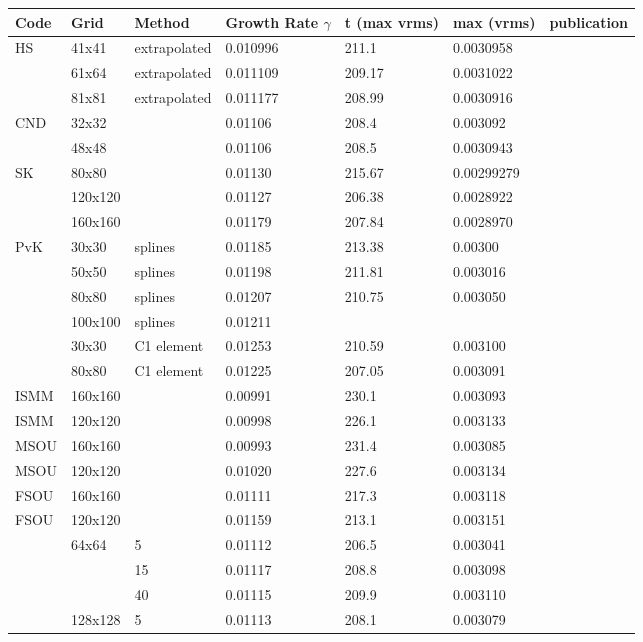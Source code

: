 \newpage



\begin{center}
\begin{tabular}{lllllll}
\hline
Code & Grid & Method & Growth Rate $\gamma$ & t (max vrms) & max (vrms)   & publication\\
\hline\hline
HS & 41x41 & extrapolated & 0.010996 & 211.1  & 0.0030958 & \cite{vaks97}\\
   & 61x64 & extrapolated & 0.011109 & 209.17 & 0.0031022 & \\
   & 81x81 & extrapolated & 0.011177 & 208.99 & 0.0030916 & \\
\hline
CND & 32x32 && 0.01106 & 208.4 & 0.003092 & \cite{vaks97}\\
    & 48x48 && 0.01106 & 208.5 & 0.0030943 \\
\hline 
SK &   80x80 && 0.01130 & 215.67 & 0.00299279 & \cite{vaks97}\\
   & 120x120 && 0.01127 & 206.38 & 0.0028922 \\
   & 160x160 && 0.01179 & 207.84 & 0.0028970 \\
\hline
PvK & 30x30 & splines & 0.01185 & 213.38 & 0.00300 & \cite{vaks97}\\
    & 50x50 & splines & 0.01198 & 211.81 & 0.003016 \\
    & 80x80 & splines & 0.01207 & 210.75 & 0.003050 \\
    & 100x100 & splines & 0.01211 &  & \\
    & 30x30 & C1 element & 0.01253 & 210.59 & 0.003100 \\
    & 80x80 & C1 element & 0.01225 & 207.05 & 0.003091 \\
\hline
ISMM & 160x160	& &0.00991 & 230.1 & 0.003093	 &\cite{soga01}\\
ISMM & 120x120	& &0.00998 & 226.1 & 0.003133	 &\\
MSOU & 160x160	& &0.00993 & 231.4 & 0.003085	 &\\
MSOU & 120x120	& &0.01020 & 227.6 & 0.003134	 &\\
FSOU & 160x160	& &0.01111 & 217.3 & 0.003118	 &\\
FSOU & 120x120	& &0.01159 & 213.1 & 0.003151	 &\\
\hline
&64x64 	 &5 	&0.01112 	&206.5 	&0.003041 & \cite{taki03} \\
&	 &15 	&0.01117 	&208.8 	&0.003098 & \\
&	 &40 	&0.01115 	&209.9 	&0.003110 & \\
&128x128 &5 	&0.01113 	&208.1 	&0.003079 & \\

\end{tabular}
\end{center}
